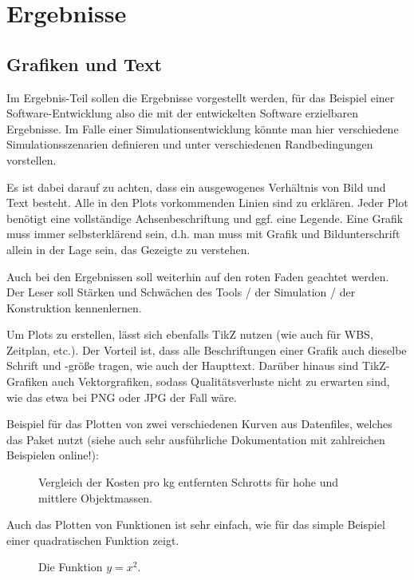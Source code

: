 \chapter{Ergebnisse}
\label{sec:ergebnisse}

\section{Grafiken und Text}

Im Ergebnis-Teil sollen die Ergebnisse vorgestellt werden, für das Beispiel einer Software-Entwicklung also die mit der entwickelten Software erzielbaren 
Ergebnisse. Im Falle einer Simulationsentwicklung könnte man hier verschiedene Simulationsszenarien definieren und unter verschiedenen Randbedingungen 
vorstellen.

Es ist dabei darauf zu achten, dass ein ausgewogenes Verhältnis von Bild und Text besteht. Alle in den Plots vorkommenden Linien sind zu erklären. Jeder Plot 
benötigt eine vollständige Achsenbeschriftung und ggf. eine Legende. Eine Grafik muss immer selbsterklärend sein, d.h. man muss mit Grafik und Bildunterschrift 
allein in der Lage sein, das Gezeigte zu verstehen.

Auch bei den Ergebnissen soll weiterhin auf den roten Faden geachtet werden. Der Leser soll Stärken und Schwächen des Tools / der Simulation / der Konstruktion 
kennenlernen.

Um Plots zu erstellen, lässt sich ebenfalls TikZ nutzen (wie auch für WBS, Zeitplan, etc.). Der Vorteil ist, dass alle Beschriftungen einer Grafik auch 
dieselbe Schrift und -größe tragen, wie auch der Haupttext. Darüber hinaus sind TikZ-Grafiken auch Vektorgrafiken, sodass Qualitätsverluste nicht zu erwarten 
sind, wie das etwa bei PNG oder JPG der Fall wäre.

Beispiel für das Plotten von zwei verschiedenen Kurven aus Datenfiles, welches das Paket  nutzt (siehe auch sehr ausführliche Dokumentation mit 
zahlreichen Beispielen online!):

\begin{figure}[h!]
 \centering
 
 \caption{Vergleich der Kosten pro kg entfernten Schrotts für hohe und mittlere Objektmassen.\label{abb:vergleich}}
\end{figure}

Auch das Plotten von Funktionen ist sehr einfach, wie  für das simple Beispiel einer quadratischen Funktion zeigt.

\begin{figure}[h!]
  \centering
  \caption{Die Funktion $y=x^2$.\label{abb:x2}}
\end{figure}

